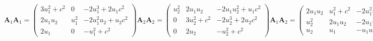 \documentclass[a4paper,12pt]{article}
\begin{document}
\begin{subequations}
\begin{equation}
\mathbf{A}_1\mathbf{A}_1 =
\begin{pmatrix}
3u_1^2 + c^2 & 0  & -2u_1^3 + 2u_1c^2 \\
2u_1u_2  & u_1^2  & -2u_1^2u_2 + u_2c^2 \\
2u_1  & 0   & -u_1^2 + c^2
\end{pmatrix}
\end{equation}
\begin{equation}
    \mathbf{A}_2\mathbf{A}_2 =
\begin{pmatrix}
u_2^2  & 2u_1u_2  & -2u_1u_2^2 + u_1c^2 \\
0    & 3u_2^2 + c^2 & -2u_2^3 + 2u_2c^2 \\
0  & 2u_2  & -u_2^2 + c^2
\end{pmatrix}
\end{equation}
\begin{equation}
\mathbf{A}_1\mathbf{A}_2 =
\begin{pmatrix}
2u_1u_2  & u_1^2 + c^2  & -2u_1^2u_2 \\
u_2^2  & 2u_1u_2  & -2u_1u_2^2 + u_1c^2 \\
u_2  & u_1  & -u_1u_2
\end{pmatrix}
\end{equation}
\begin{equation}
\mathbf{A}_2\mathbf{A}_1 =
\begin{pmatrix}
2u_1u_2  & u_1^2  & -2u_1^2u_2 + u_2c^2 \\
u_2^2 + c^2  & 2u_1u_2  & -2u_1u_2^2 \\
u_2  & u_1  & -u_1u_2
\end{pmatrix}
\end{equation}
\end{subequations}




\end{document}
